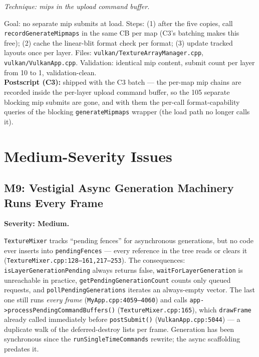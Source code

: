 \documentclass[11pt,a4paper]{article}
\begin{document}
\textit{Technique: mips in the upload command buffer.}

\begin{tcolorbox}[promptbox={Prompt --- H8: fold mip generation into the upload submit}]
Goal: no separate mip submits at load. Steps: (1) after the five copies, call
\texttt{recordGenerateMipmaps} in the same CB per map (C3's batching makes this
free); (2) cache the linear-blit format check per format; (3) update tracked
layouts once per layer. Files: \texttt{vulkan/TextureArrayManager.cpp},
\texttt{vulkan/VulkanApp.cpp}. Validation: identical mip content, submit count
per layer from 10 to 1, validation-clean.
\\ \textbf{Postscript (C3):} shipped with the C3 batch --- the per-map mip
chains are recorded inside the per-layer upload command buffer, so the 105
separate blocking mip submits are gone, and with them the per-call
format-capability queries of the blocking \texttt{generateMipmaps} wrapper
(the load path no longer calls it).
\end{tcolorbox}

\section{Medium-Severity Issues}

\subsection{M9: Vestigial Async Generation Machinery Runs Every Frame}
\label{sec:m9}

\textbf{Severity: Medium.}

\texttt{TextureMixer} tracks ``pending fences'' for asynchronous generations,
but no code ever inserts into \texttt{pendingFences} --- every reference in the
tree reads or clears it (\texttt{TextureMixer.cpp:128--161,217--253}). The
consequences: \texttt{isLayerGenerationPending} always returns false,
\texttt{waitForLayerGeneration} is unreachable in practice,
\texttt{getPendingGenerationCount} counts only queued requests, and
\texttt{pollPendingGenerations} iterates an always-empty vector. The last one
still runs \emph{every frame} (\texttt{MyApp.cpp:4059--4060}) and calls
\texttt{app->processPendingCommandBuffers()} (\texttt{TextureMixer.cpp:165}),
which \texttt{drawFrame} already called immediately before
\texttt{postSubmit()} (\texttt{VulkanApp.cpp:5044}) --- a duplicate walk of the
deferred-destroy lists per frame. Generation has been synchronous since the
\texttt{runSingleTimeCommands} rewrite; the async scaffolding predates it.
\end{document}
